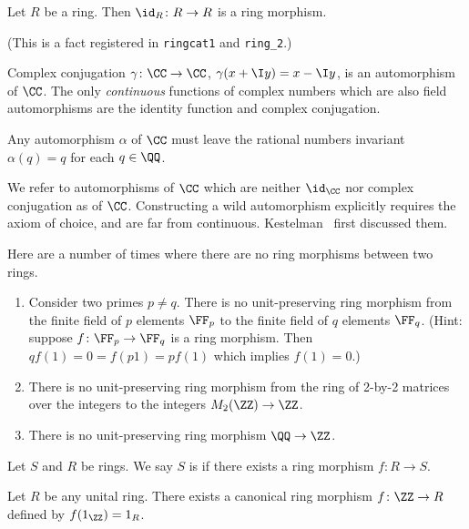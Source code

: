 \begin{example}%
Let $R$ be a ring. Then $\id_{R}\colon R\to R$ is a ring morphism.
\end{example}

(This is a fact registered in \texttt{ringcat1} and \texttt{ring\_2}.)

\begin{example}
Complex conjugation $\gamma\colon\CC\to\CC$, $\gamma(x+\I y)=x-\I y$,
is an automorphism of $\CC$. The only \emph{continuous} functions of
complex numbers which are also field automorphisms are the identity
function and complex conjugation.

Any automorphism $\alpha$ of $\CC$ must leave the rational numbers
invariant $\alpha(q)=q$ for each $q\in\QQ$.

We refer to automorphisms of $\CC$ which are neither $\id_{\CC}$ nor
complex conjugation as  of $\CC$.
Constructing a wild automorphism explicitly requires the axiom of choice,
and are far from continuous. Kestelman~\cite{kestelman1951automorphisms}
first discussed them.
\end{example}

\begin{example}
Here are a number of times where there are no ring morphisms between
two rings.
\begin{enumerate}
\item Consider two primes $p\neq q$. There is no unit-preserving ring
morphism from the finite field of $p$ elements $\FF_{p}$ to the finite
field of $q$ elements $\FF_{q}$. (Hint: suppose
$f\colon\FF_{p}\to\FF_{q}$ is a ring morphism. Then
$qf(1)=0=f(p1)=pf(1)$ which implies $f(1)=0$.)
\item  There is no unit-preserving ring morphism from the ring of 2-by-2
matrices over the integers to the integers $M_{2}(\ZZ)\to\ZZ$.
\item There is no unit-preserving ring morphism $\QQ\to\ZZ$.
\end{enumerate}
\end{example}

\begin{definition}
Let $S$ and $R$ be rings.
We say $S$ is  if there exists a ring morphism
$f\colon R\to S$.
\end{definition}

\begin{example}\label{ex:ring:canHomInt}
Let $R$ be any unital ring. There exists a canonical ring morphism
$f\colon\ZZ\to R$ defined by $f(1_{\ZZ})=1_{R}$.
\end{example}

